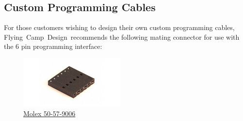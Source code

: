 \documentclass[10pt,letterpaper]{datasheet}
\newcommand{\fcd}{Flying~Camp~Design}
\begin{document}
\begin{flushleft}
\subsection*{Custom Programming Cables}
  For those customers wishing to design their own custom programming cables, \fcd\ recommends the following mating connector for use with the 6 pin programming interface:

  \begin{figure}[!h]
    \label{fig:50-57-9006}
    \begin{center}
      \includegraphics[width=2 in]{50-57-9006_sml}
    \end{center}
    \caption{\href{http://www.molex.com/pdm_docs/sd/050579006_sd.pdf}%
                  {Molex 50-57-9006}}
  \end{figure}

\end{flushleft}

\newpage
\end{document}
